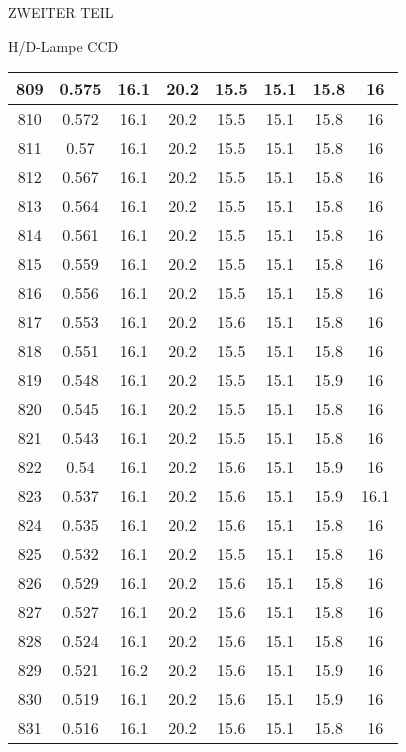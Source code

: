 \begin{appendix}
\begin{chapter}{ZWEITER TEIL}
\begin{section}{H/D-Lampe CCD}
\begin{scriptsize}
\begin{longtable}[htbp]{|c|c|c|c|c|c|c|c|}
            809 & 0.575 & 16.1 & 20.2 & 15.5 & 15.1 & 15.8 & 16 \\ \hline
            810 & 0.572 & 16.1 & 20.2 & 15.5 & 15.1 & 15.8 & 16 \\ \hline
            811 & 0.57 & 16.1 & 20.2 & 15.5 & 15.1 & 15.8 & 16 \\ \hline
            812 & 0.567 & 16.1 & 20.2 & 15.5 & 15.1 & 15.8 & 16 \\ \hline
            813 & 0.564 & 16.1 & 20.2 & 15.5 & 15.1 & 15.8 & 16 \\ \hline
            814 & 0.561 & 16.1 & 20.2 & 15.5 & 15.1 & 15.8 & 16 \\ \hline
            815 & 0.559 & 16.1 & 20.2 & 15.5 & 15.1 & 15.8 & 16 \\ \hline
            816 & 0.556 & 16.1 & 20.2 & 15.5 & 15.1 & 15.8 & 16 \\ \hline
            817 & 0.553 & 16.1 & 20.2 & 15.6 & 15.1 & 15.8 & 16 \\ \hline
            818 & 0.551 & 16.1 & 20.2 & 15.5 & 15.1 & 15.8 & 16 \\ \hline
            819 & 0.548 & 16.1 & 20.2 & 15.5 & 15.1 & 15.9 & 16 \\ \hline
            820 & 0.545 & 16.1 & 20.2 & 15.5 & 15.1 & 15.8 & 16 \\ \hline
            821 & 0.543 & 16.1 & 20.2 & 15.5 & 15.1 & 15.8 & 16 \\ \hline
            822 & 0.54 & 16.1 & 20.2 & 15.6 & 15.1 & 15.9 & 16 \\ \hline
            823 & 0.537 & 16.1 & 20.2 & 15.6 & 15.1 & 15.9 & 16.1 \\ \hline
            824 & 0.535 & 16.1 & 20.2 & 15.6 & 15.1 & 15.8 & 16 \\ \hline
            825 & 0.532 & 16.1 & 20.2 & 15.5 & 15.1 & 15.8 & 16 \\ \hline
            826 & 0.529 & 16.1 & 20.2 & 15.6 & 15.1 & 15.8 & 16 \\ \hline
            827 & 0.527 & 16.1 & 20.2 & 15.6 & 15.1 & 15.8 & 16 \\ \hline
            828 & 0.524 & 16.1 & 20.2 & 15.6 & 15.1 & 15.8 & 16 \\ \hline
            829 & 0.521 & 16.2 & 20.2 & 15.6 & 15.1 & 15.9 & 16 \\ \hline
            830 & 0.519 & 16.1 & 20.2 & 15.6 & 15.1 & 15.9 & 16 \\ \hline
            831 & 0.516 & 16.1 & 20.2 & 15.6 & 15.1 & 15.8 & 16 \\ \hline

\end{longtable}
\end{scriptsize}
\end{section}
\end{chapter}
\end{appendix}
